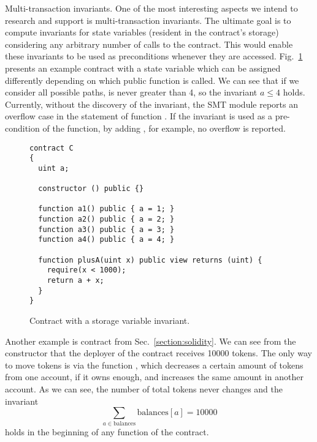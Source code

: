 \begin{paragraph}{Multi-transaction invariants.}
One of the most interesting aspects we intend to research and support is
multi-transaction invariants.
%
The ultimate goal is to compute invariants for state variables (resident in the
contract's storage) considering any arbitrary number of calls to the contract.
%
This would enable these invariants to be used as preconditions whenever they
are accessed.
%
Fig.~\ref{fig:invariant_a} presents an example contract with a state variable
 which can be assigned differently depending on which public function
is called.
%
We can see that if we consider all possible paths,  is never greater
than 4, so the invariant $a \le 4$ holds.
%
Currently, without the discovery of the invariant, the SMT module reports an
overflow case in the  statement of function .
%
If the invariant is used as a pre-condition of the function, by adding
, for example, no overflow is reported.

\begin{figure}
\begin{verbatim}
contract C
{
  uint a;

  constructor () public {}

  function a1() public { a = 1; }
  function a2() public { a = 2; }
  function a3() public { a = 3; }
  function a4() public { a = 4; }

  function plusA(uint x) public view returns (uint) {
    require(x < 1000);
    return a + x;
  }
}
\end{verbatim}
\caption{Contract with a storage variable invariant.}
\label{fig:invariant_a}
\end{figure}

Another example is contract  from Sec.~\ref{section:solidity}.
%
We can see from the constructor that the deployer of the contract receives
10000 tokens.
%
The only way to move tokens is via the function , which
decreases a certain amount of tokens from one account, if it owns enough, and
increases the same amount in another account.
%
As we can see, the number of total tokens never changes and the invariant
$$\sum_{a \in \mathrm{balances}} \mathrm{balances}[a] = 10000$$ holds in the
beginning of any function of the contract.
\end{paragraph}

